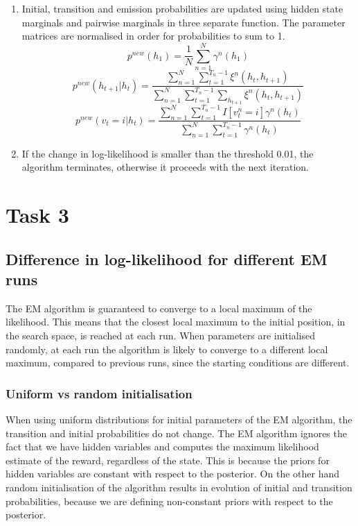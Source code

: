 \documentclass[a4paper, 11pt]{article}
\begin{document}
\begin{enumerate}
\item Initial, transition and emission probabilities are updated using hidden state marginals and pairwise marginals in three separate function. The parameter matrices are normalised in order for probabilities to sum to 1.
\begin{equation}
p^{new}(h_1) = \frac{1}{N}\sum\limits_{n=1}^N \gamma^n(h_1) 
\end{equation}
\begin{equation}
p^{new}(h_{t+1}|h_t) = \frac{\sum\limits_{n=1}^N \sum\limits_{t=1}^{T_n-1}\xi^n(h_t,h_{t+1})}
{ \sum\limits_{n=1}^N \sum\limits_{t=1}^{T_n-1} \sum\limits_{h_{t+1}} \xi^n(h_t,h_{t+1})}
\end{equation}
\begin{equation}
p^{new}(v_t=i|h_t) = \frac{\sum\limits_{n=1}^N \sum\limits_{t=1}^{T_n-1}  I[v_t^n = i] \gamma^n(h_t)}
{ \sum\limits_{n=1}^N \sum\limits_{t=1}^{T_n-1} \gamma^n(h_t)} 
\end{equation}



\item If the change in log-likelihood is smaller than the threshold 0.01, the algorithm terminates, otherwise it proceeds with the next iteration.
\end{enumerate}


\section{Task 3}
\subsection{Difference in log-likelihood for different EM runs}
The EM algorithm is guaranteed to converge to a local maximum of the likelihood. This means that the closest local maximum to the initial position, in the search space, is reached at each run.  When parameters are initialised randomly, at each run the algorithm is likely to converge to a different local maximum, compared to previous runs, since the starting conditions are different.

\subsubsection{Uniform vs random initialisation}
When using uniform distributions for initial parameters of the EM algorithm, the transition and initial probabilities do not change. The EM algorithm ignores the fact that we have hidden variables and computes the maximum likelihood estimate of the reward, regardless of the state. This is because the priors for hidden variables are constant with respect to the posterior.
On the other hand random initialisation of the algorithm results in evolution of initial and transition probabilities, because we are defining non-constant priors with respect to the posterior.  
\end{document}
